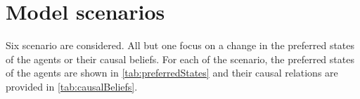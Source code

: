 \documentclass[12pt]{article}
\begin{document}
\section{Model scenarios}
\label{sec:steps}

Six scenario are considered. All but one focus on a change in the preferred states of the agents or their causal beliefs. For each of the scenario, the preferred states of the agents are shown in \autoref{tab:preferredStates} and their causal relations are provided in \autoref{tab:causalBeliefs}.

\end{document}
